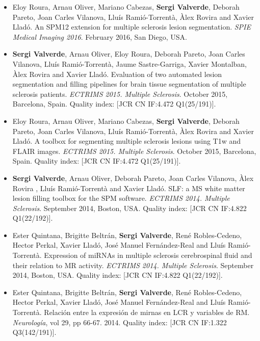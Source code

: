 \begin{itemize}
\item Eloy Roura, Arnau Oliver, Mariano Cabezas, \textbf{Sergi Valverde}, Deborah Pareto, Joan Carles Vilanova, Llu\'{i}s Rami\'{o}-Torrent\`{a}, \`{A}lex Rovira and Xavier Llad\'{o}. An SPM12 extension for multiple sclerosis lesion segmentation. \textit{SPIE Medical Imaging 2016}. February 2016, San Diego, USA.

\item \textbf{Sergi Valverde}, Arnau Oliver, Eloy Roura, Deborah Pareto, Joan Carles Vilanova, Llu\'{i}s Rami\'{o}-Torrent\`{a}, Jaume Sastre-Garriga, Xavier Montalban, \`{A}lex Rovira and Xavier Llad\'{o}. Evaluation of two automated lesion segmentation and filling pipelines for brain tissue segmentation of multiple sclerosis patients. \textit{ECTRIMS 2015. Multiple Sclerosis}. October 2015, Barcelona, Spain.  Quality index: [JCR CN IF:4.472 Q1(25/191)].

\item Eloy Roura, Arnau Oliver, Mariano Cabezas, \textbf{Sergi Valverde}, Deborah Pareto, Joan Carles Vilanova, Llu\'{i}s Rami\'{o}-Torrent\`{a}, \`{A}lex Rovira and Xavier Llad\'{o}. A toolbox for segmenting multiple sclerosis lesions using T1w and FLAIR images. \textit{ECTRIMS 2015. Multiple Sclerosis}. October 2015, Barcelona, Spain.  Quality index: [JCR CN IF:4.472 Q1(25/191)].

\item \textbf{Sergi Valverde}, Arnau Oliver, Deborah Pareto, Joan Carles Vilanova, \`{A}lex Rovira , Llu\'{i}s Rami\'{o}-Torrent\`{a} and Xavier Llad\'{o}.
SLF: a MS white matter lesion filling toolbox for the SPM software. \textit{ECTRIMS 2014. Multiple Sclerosis}. September 2014, Boston, USA.  Quality index: [JCR CN IF:4.822 Q1(22/192)].

\item Ester Quintana, Brigitte Beltr\'{a}n, \textbf{Sergi Valverde}, Ren\'{e} Robles-Cedeno, Hector Perkal, Xavier  Llad\'{o}, Jos\'{e} Manuel Fern\'{a}ndez-Real and Llu\'{i}s Rami\'{o}-Torrent\`{a}. Expression of miRNAs in multiple sclerosis cerebrospinal fluid and their relation to MR activity. \textit{ECTRIMS 2014. Multiple Sclerosis}. September 2014, Boston, USA.  Quality index: [JCR CN IF:4.822 Q1(22/192)].

\item  Ester Quintana, Brigitte Beltr\'{a}n, \textbf{Sergi Valverde}, Ren\'{e} Robles-Cedeno, Hector Perkal, Xavier  Llad\'{o}, Jos\'{e} Manuel Fern\'{a}ndez-Real and Llu\'{i}s Rami\'{o}-Torrent\`{a}. Relaci\'{o}n entre la expresi\'{o}n de mirnas en LCR y variables de RM. \textit{Neurolog\'{i}a}, vol 29, pp 66-67. 2014.  Quality index: [JCR CN IF:1.322 Q3(142/191)].


\end{itemize}
